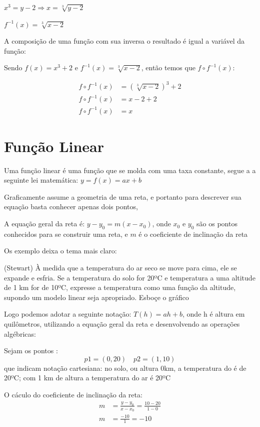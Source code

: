 \begin{multicols*}{2}
    $x^3 = y - 2 \Rightarrow x = \sqrt[3]{y - 2}$

    $f^{-1}(x) = \sqrt[3]{x - 2}$

    A composição de uma função com sua inversa o resultado é igual a variável da função:

    Sendo $f(x) = x^3 +2$ e $f^{-1}(x) = \sqrt[3]{x - 2}$, então temos que $f \circ f^{-1}(x)$:

    \begin{align*}
        f \circ f^{-1}(x) &= (\sqrt[3]{x - 2})^3 +2\\
        f \circ f^{-1}(x) &= x -2 +2\\
        f \circ f^{-1}(x) &= x
    \end{align*}
    

    \section*{ Função Linear}
    Uma função linear é uma função que se molda com uma taxa constante, segue a a seguinte lei 				matemática: $y = f(x) = ax + b$

    Graficamente assume a geometria de uma reta, e portanto para descrever sua equação basta 				conhecer apenas dois pontos,

    A equação geral da reta é: $y - y_0 = m(x-x_0)$, onde $x_0$ e $y_0$ são os pontos conhecidos 			para se construir uma reta, e $m$ é o coeficiente de inclinação da reta

    Os exemplo deixa o tema mais claro:


    (Stewart) À medida que a temperatura do ar seco se move para cima, ele se expande e 					esfria. Se a temperatura do solo for 20ºC e temperatura a uma altitude de 1 km for de 10ºC, 			expresse a temperatura como uma função da altitude, supondo um modelo linear seja apropriado. 			Esboçe o gráfico

    Logo podemos adotar a seguinte notação: $T(h) = ah +b$, onde h é altura em quilômetros, 				utilizando a equação geral da reta e desenvolvendo as operações algébricas:

    Sejam os pontos :
    \[
        p1 = (0,20) \quad
        p2 = (1,10)
    \]
    que indicam notação cartesiana: no solo, ou altura 0km, a temperatura do é de 20ºC; com 1 km de 		altura a temperatura do ar é 20ºC

    O cáculo do coeficiente de inclinação da reta:
    \begin{align*}
        m &= \frac{y-y_0}{x - x_0} = \frac{ 10 - 20}{ 1 - 0}\\[1ex]
        m &= \frac{-10}{1} = -10
    \end{align*}


\end{multicols*}
